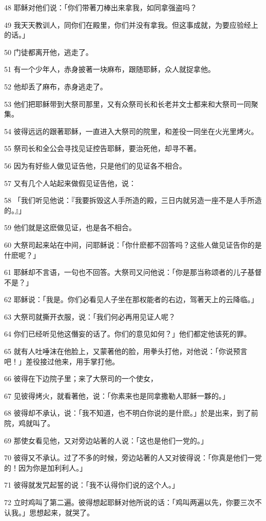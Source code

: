 \par 48 耶稣对他们说：「你们带著刀棒出来拿我，如同拿强盗吗？
\par 49 我天天教训人，同你们在殿里，你们并没有拿我。但这事成就，为要应验经上的话。」
\par 50 门徒都离开他，逃走了。
\par 51 有一个少年人，赤身披著一块麻布，跟随耶稣，众人就捉拿他。
\par 52 他却丢了麻布，赤身逃走了。
\par 53 他们把耶稣带到大祭司那里，又有众祭司长和长老并文士都来和大祭司一同聚集。
\par 54 彼得远远的跟著耶稣，一直进入大祭司的院里，和差役一同坐在火光里烤火。
\par 55 祭司长和全公会寻找见证控告耶稣，要治死他，却寻不著。
\par 56 因为有好些人做见证告他，只是他们的见证各不相合。
\par 57 又有几个人站起来做假见证告他，说：
\par 58 「我们听见他说：『我要拆毁这人手所造的殿，三日内就另造一座不是人手所造的。』」
\par 59 他们就是这麽做见证，也是各不相合。
\par 60 大祭司起来站在中间，问耶稣说：「你什麽都不回答吗？这些人做见证告你的是什麽呢？」
\par 61 耶稣却不言语，一句也不回答。大祭司又问他说：「你是那当称颂者的儿子基督不是？」
\par 62 耶稣说：「我是。你们必看见人子坐在那权能者的右边，驾著天上的云降临。」
\par 63 大祭司就撕开衣服，说：「我们何必再用见证人呢？
\par 64 你们已经听见他这僭妄的话了。你们的意见如何？」他们都定他该死的罪。
\par 65 就有人吐唾沫在他脸上，又蒙著他的脸，用拳头打他，对他说：「你说预言吧！」差役接过他来，用手掌打他。
\par 66 彼得在下边院子里；来了大祭司的一个使女，
\par 67 见彼得烤火，就看著他，说：「你素来也是同拿撒勒人耶稣一夥的。」
\par 68 彼得却不承认，说：「我不知道，也不明白你说的是什麽。」於是出来，到了前院，鸡就叫了。
\par 69 那使女看见他，又对旁边站著的人说：「这也是他们一党的。」
\par 70 彼得又不承认。过了不多的时候，旁边站著的人又对彼得说：「你真是他们一党的！因为你是加利利人。」
\par 71 彼得就发咒起誓的说：「我不认得你们说的这个人。」
\par 72 立时鸡叫了第二遍。彼得想起耶稣对他所说的话：「鸡叫两遍以先，你要三次不认我。」思想起来，就哭了。

